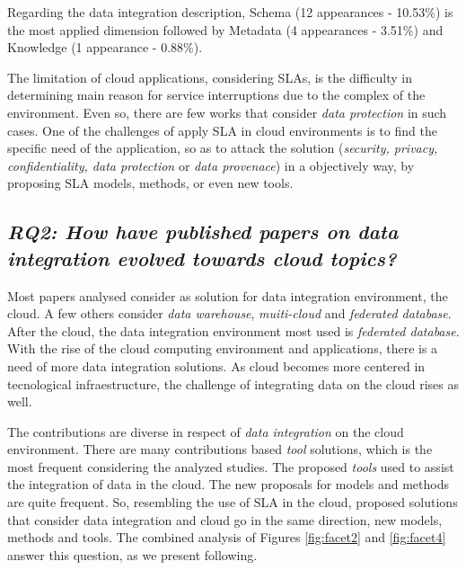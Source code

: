 Regarding the data integration description, Schema (12 appearances - 10.53\%) is
the most applied dimension followed by Metadata (4 appearances - 3.51\%) and
Knowledge (1 appearance - 0.88\%).

The limitation of cloud applications, considering SLAs, is the difficulty in
determining main reason for service interruptions due to the complex of
the environment. Even so, there are few works that consider \textit{data
protection} in such cases. One of the challenges of apply SLA in cloud
environments is to find the specific need of the application, so as to attack
the solution (\textit{security, privacy, confidentiality, data protection} or
\textit{data provenace}) in a objectively way, by proposing SLA models, methods,
or even new tools.



\subsection{\textit{RQ2: How have published papers on data
 integration evolved towards cloud topics?}}

Most papers analysed consider as solution for data integration environment, the
cloud. A few others consider \textit{data warehouse}, \textit{muiti-cloud} and
\textit{federated database}. After the cloud, the data integration environment
most used is \textit{federated database}. With the rise of the cloud computing
environment and applications, there is a need of more data integration
solutions. As cloud becomes more centered in tecnological infraestructure, the
challenge of integrating data on the cloud rises as well. 

The contributions are diverse in respect of \textit{data integration} on the
cloud environment. There are many contributions based \textit{tool} solutions,
which is the most frequent considering the analyzed studies. The
proposed \textit{tools} used to assist the integration of data in the cloud.
The new proposals for models and methods are quite frequent. So, resembling the
use of SLA in the cloud, proposed solutions that consider data integration and
cloud go in the same direction, new models, methods and tools. The combined
analysis of Figures \ref{fig:facet2} and \ref{fig:facet4} answer this question,
as we present following.



